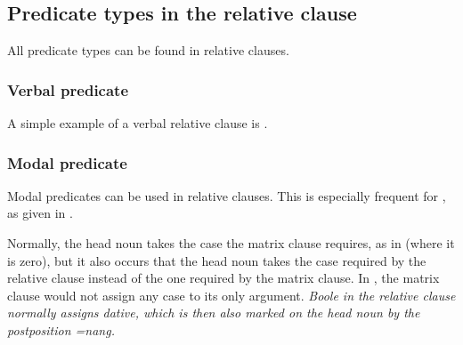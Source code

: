 \subsection{Predicate types in the relative clause}\label{sec:cls:Predicatetypesintherelativeclause}
All predicate types can be found in relative clauses.

\subsubsection{Verbal predicate}\label{sec:cls:verbal}
A simple example of a verbal relative clause is .


\subsubsection{Modal predicate}\label{sec:cls:modal}
Modal predicates can be used in relative clauses. This is especially frequent for , as given in .

 

Normally, the head noun takes the case the matrix clause requires, as in  (where it is zero), but it also occurs that the head noun takes the case required by the relative clause instead of the one required by the matrix clause. In , the matrix clause would not assign any case to its only argument.  \em Boole \em in the relative clause normally assigns dative, which is then also marked on the head noun by the postposition \em =nang\em.

 \\
 
